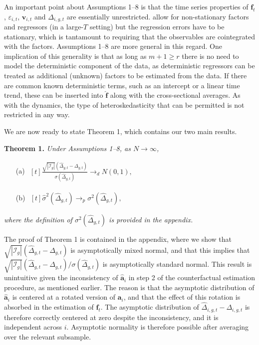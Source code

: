 \documentclass[12pt,fleqn]{article}
\def\*#1{\mathbf{#1}}
\begin{document}
An important point about Assumptions 1--8 is that the time series properties of $\*f_t$, $\varepsilon_{i,t}$, $\*v_{i,t}$ and $\Delta_{i,g,t}$ are essentially unrestricted. \citet{chan2022pcdid} allow for non-stationary factors and regressors (in a large-$T$ setting) but the regression errors have to be stationary, which is tantamount to requiring that the observables are cointegrated with the factors. Assumptions 1--8 are more general in this regard. One implication of this generality is that as long as $m+1\geq r$ there is no need to model the deterministic component of the data, as deterministic regressors can be treated as additional (unknown) factors to be estimated from the data. If there are common known deterministic terms, such as an intercept or a linear time trend, these can be inserted into $\widehat{\*f}$ along with the cross-sectional averages. As with the dynamics, the type of heteroskedasticity that can be permitted is not restricted in any way.

We are now ready to state Theorem 1, which contains our two main results.

\bigskip

\noindent \textbf{Theorem 1.} \emph{Under Assumptions 1--8, as $N\to\infty$,}
\begin{itemize}
  \item[(a) ] $\begin{aligned}[t]
    \frac{\sqrt{|\mathcal{I}_g|}(\widehat \Delta_{g,t} - \Delta_{g,t})}{\sigma(\widehat \Delta_{g,t})} \to_d N(0, 1 ),
    \end{aligned}$

  \item[(b) ] $\begin{aligned}[t]
    \widehat \sigma^2(\widehat \Delta_{g,t}) \to_p \sigma^2(\widehat \Delta_{g,t}),
    \end{aligned}$
\end{itemize}
\emph{where the definition of $\sigma^2(\widehat \Delta_{g,t})$ is provided in the appendix.}

\bigskip

The proof of Theorem 1 is contained in the appendix, where we show that $\sqrt{|\mathcal{I}_g|}(\widehat \Delta_{g,t} - \Delta_{g,t})$ is asymptotically mixed normal, and that this implies that $\sqrt{|\mathcal{I}_g|}(\widehat \Delta_{g,t} - \Delta_{g,t})/\sigma(\widehat \Delta_{g,t})$ is asymptotically standard normal. This result is unintuitive given the inconsistency of $\widehat{\*a}_i$ in step 2 of the counterfactual estimation procedure, as mentioned earlier. The reason is that the asymptotic distribution of $\widehat{\*a}_i$ is centered at a rotated version of $\*a_i$, and that the effect of this rotation is absorbed in the estimation of $\*f_t$. The asymptotic distribution of $\widehat \Delta_{i,g,t} - \Delta_{i,g,t}$ is therefore correctly centered at zero despite the inconsistency, and it is independent across $i$. Asymptotic normality is therefore possible after averaging over the relevant subsample.
\end{document}
